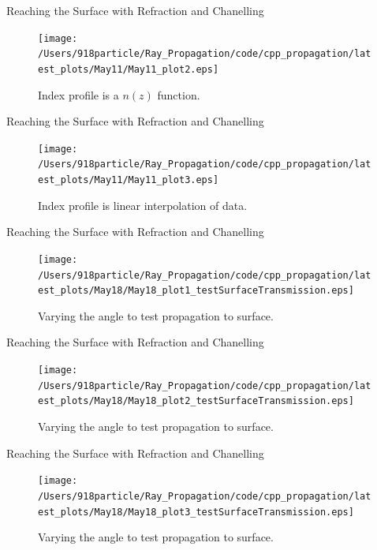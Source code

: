 \documentclass{beamer}
\begin{document}
\begin{frame}{Reaching the Surface with Refraction and Chanelling}
\begin{figure}
\begin{center}
\texttt{[image: /Users/918particle/Ray\_Propagation/code/cpp\_propagation/latest\_plots/May11/May11\_plot2.eps]}
\caption{\label{fig:fig4} Index profile is a $n(z)$ function.}
\end{center}
\end{figure}
\end{frame}

\begin{frame}{Reaching the Surface with Refraction and Chanelling}
\begin{figure}
\begin{center}
\texttt{[image: /Users/918particle/Ray\_Propagation/code/cpp\_propagation/latest\_plots/May11/May11\_plot3.eps]}
\caption{\label{fig:fig5} Index profile is linear interpolation of data.}
\end{center}
\end{figure}
\end{frame}

\begin{frame}{Reaching the Surface with Refraction and Chanelling}
\begin{figure}
\begin{center}
\texttt{[image: /Users/918particle/Ray\_Propagation/code/cpp\_propagation/latest\_plots/May18/May18\_plot1\_testSurfaceTransmission.eps]}
\caption{\label{fig:fig6} Varying the angle to test propagation to surface.}
\end{center}
\end{figure}
\end{frame}

\begin{frame}{Reaching the Surface with Refraction and Chanelling}
\begin{figure}
\begin{center}
\texttt{[image: /Users/918particle/Ray\_Propagation/code/cpp\_propagation/latest\_plots/May18/May18\_plot2\_testSurfaceTransmission.eps]}
\caption{\label{fig:fig7} Varying the angle to test propagation to surface.}
\end{center}
\end{figure}
\end{frame}

\begin{frame}{Reaching the Surface with Refraction and Chanelling}
\begin{figure}
\begin{center}
\texttt{[image: /Users/918particle/Ray\_Propagation/code/cpp\_propagation/latest\_plots/May18/May18\_plot3\_testSurfaceTransmission.eps]}
\caption{\label{fig:fig8} Varying the angle to test propagation to surface.}
\end{center}
\end{figure}
\end{frame}
\end{document}
